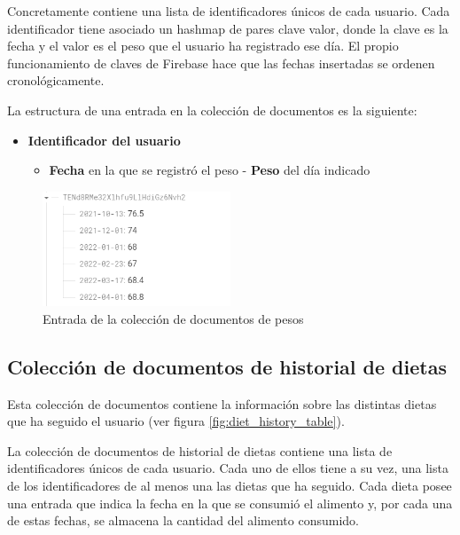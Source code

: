 Concretamente contiene una lista de identificadores únicos de cada usuario. Cada identificador tiene asociado un hashmap de pares clave valor, donde la clave es la fecha y el valor es el peso que el usuario ha registrado ese día. El propio funcionamiento de claves de Firebase hace que las fechas insertadas se ordenen cronológicamente.

La estructura de una entrada en la colección de documentos es la siguiente:

\begin{itemize}
    \item \textbf{Identificador del usuario}
    \begin{itemize}
        \item \textbf{Fecha} en la que se registró el peso - \textbf{Peso} del día indicado 
    \end{itemize}
\end{itemize}

\begin{figure}[H]
    \centering
    \includegraphics[width=0.5\textwidth]{Images/Capitulo5/tabla_pesos.png}
    \caption{Entrada de la colección de documentos de pesos}
    \label{fig:tabla_pesos}
\end{figure}


\subsection{Colección de documentos de historial de dietas}
Esta colección de documentos contiene la información sobre las distintas dietas que ha seguido el usuario (ver figura \ref{fig:diet_history_table}).

La colección de documentos de historial de dietas contiene una lista de identificadores únicos de cada usuario. Cada uno de ellos tiene a su vez, una lista de los identificadores de al menos una las dietas que ha seguido. Cada dieta posee una entrada que indica la fecha en la que se consumió el alimento y, por cada una de estas fechas, se almacena la cantidad del alimento consumido.

